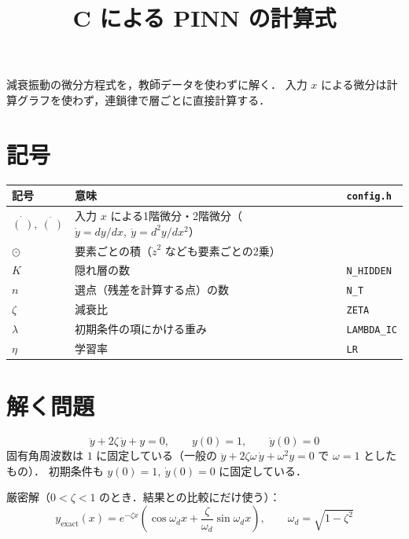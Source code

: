 \documentclass[a4paper,11pt]{ltjsarticle}
\title{C による PINN の計算式}
\date{}
\newcommand{\code}[1]{\texttt{#1}}
\begin{document}
\maketitle

減衰振動の微分方程式を，教師データを使わずに解く．
入力 $x$ による微分は計算グラフを使わず，連鎖律で層ごとに直接計算する．

\section{記号}

\begin{center}
\begin{tabular}{lll}
\toprule
記号 & 意味 & \code{config.h} \\
\midrule
$\dot{(\;)},\ \ddot{(\;)}$ & 入力 $x$ による1階微分・2階微分（$\dot y = dy/dx,\ \ddot y = d^2y/dx^2$） & \\
$\odot$ & 要素ごとの積（$\dot z^2$ なども要素ごとの2乗） & \\
$K$ & 隠れ層の数 & \code{N\_HIDDEN} \\
$n$ & 選点（残差を計算する点）の数 & \code{N\_T} \\
$\zeta$ & 減衰比 & \code{ZETA} \\
$\lambda$ & 初期条件の項にかける重み & \code{LAMBDA\_IC} \\
$\eta$ & 学習率 & \code{LR} \\
\bottomrule
\end{tabular}
\end{center}

\section{解く問題}

\begin{equation}
  \ddot y + 2\zeta\,\dot y + y = 0,\qquad
  y(0)=1,\qquad \dot y(0)=0
\end{equation}
固有角周波数は $1$ に固定している（一般の $\ddot y+2\zeta\omega\,\dot y+\omega^2y=0$ で $\omega=1$ としたもの）．
初期条件も $y(0)=1,\ \dot y(0)=0$ に固定している．

厳密解（$0<\zeta<1$ のとき．結果との比較にだけ使う）：
\begin{equation}
  y_{\mathrm{exact}}(x)=e^{-\zeta x}\left(\cos\omega_d x+\frac{\zeta}{\omega_d}\sin\omega_d x\right),
  \qquad \omega_d=\sqrt{1-\zeta^2}
\end{equation}
\end{document}

